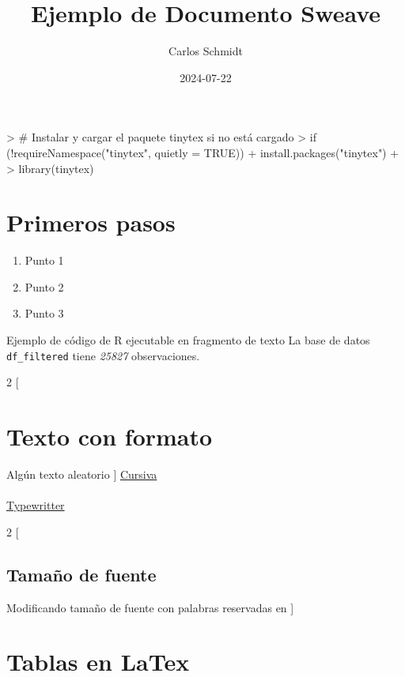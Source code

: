 \documentclass{article}
\title{Ejemplo de Documento Sweave}
\author{Carlos Schmidt}
\date{2024-07-22}
\begin{document}



\begin{Schunk}
\begin{Sinput}
> # Instalar y cargar el paquete tinytex si no está cargado
> if (!requireNamespace("tinytex", quietly = TRUE)) {
+   install.packages("tinytex")
+ }
> library(tinytex)
\end{Sinput}
\end{Schunk}


\maketitle

\section*{Primeros pasos}

\begin{enumerate}
\item Punto 1
\item Punto 2
\item Punto 3

\end{enumerate}




Ejemplo de código de R ejecutable en fragmento de texto
La base de datos \texttt{df_filtered} tiene \emph{25827} observaciones.


\begin{multicols}{2}
[
\section{Texto con formato}
Algún texto aleatorio
]
\noindent \underline{Cursiva}\\  \emph{\blindtext}   \\   \underline{Typewritter}  \\   \texttt{\blindtext}
\end{multicols}


\begin{multicols}{2}
[
\subsection{Tamaño de fuente}
Modificando tamaño de fuente con palabras reservadas en \LaTex
]
{\Huge \blindtext}   {\scriptsize \blindtext}
\end{multicols}


\section{Tablas en LaTex}
\end{document}
